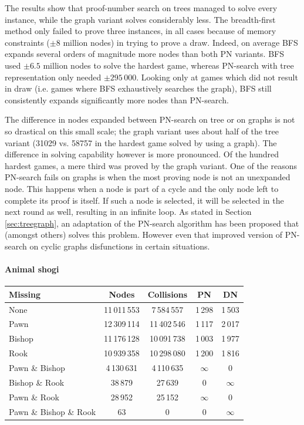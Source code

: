 \documentclass{article}
\begin{document}
The results show that proof-number search on trees managed to solve every instance, while the graph variant solves considerably less. The
breadth-first method only failed to prove three instances, in all cases because of memory constraints ($\pm8$ million nodes) in trying to prove a draw.
Indeed, on average BFS expands several orders of magnitude more nodes than both PN variants. BFS used $\pm6.5$ million nodes to solve the hardest
game, whereas PN-search with tree representation only needed $\pm295\,000$. Looking only at games which did not result in draw (i.e. games where
BFS exhaustively searches the graph), BFS still consistently expands significantly more nodes than PN-search.

The difference in nodes expanded between PN-search on tree or on graphs is not so drastical
on this small scale; the graph variant uses about half of the tree variant (31029 vs. 58757 in the hardest game solved by using a graph).
The difference in solving capability however is more pronounced. Of the hundred hardest games, a mere third was proved by the graph variant.
One of the reasons PN-search fails on graphs is when the most proving node is not an unexpanded node. This happens when a node is part of a cycle
and the only node left to complete its proof is itself. If such a node is selected, it will be selected in the next round as well, resulting
in an infinite loop. As stated in Section \ref{sec:treegraph}, an adaptation of the PN-search algorithm has been proposed that (amongst others)
solves this problem. However even that improved version of PN-search on cyclic graphs disfunctions in certain situations.

\paragraph{Animal shogi}

\begin{table}
\begin{tabular}{| l | c c c c |}
\hline
 Missing & Nodes & Collisions & PN & DN\\ \hline
 None & 11\,011\,553 & 7\,584\,557 & 1\,298 & 1\,503\\
 Pawn & 12\,309\,114 & 11\,402\,546 & 1\,117 & 2\,017\\
 Bishop & 11\,176\,128 & 10\,091\,738 & 1\,003 & 1\,977\\
 Rook & 10\,939\,358 & 10\,298\,080 & 1\,200 & 1\,816\\
 Pawn \& Bishop & 4\,130\,631 & 4\,110\,635 & $\infty$ & 0\\
 Bishop \& Rook & 38\,879 & 27\,639 & 0 & $\infty$\\
 Pawn \& Rook & 28\,952 & 25\,152 & $\infty$ & 0\\
 Pawn \& Bishop \& Rook & 63 & 0 & 0 & $\infty$\\
\hline
\end{tabular}
\end{table}
\end{document}
